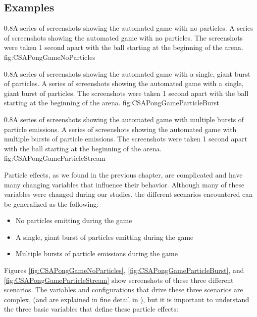 \subsection{Examples}\label{ssec:game_gameplay_examples}

{0.8}{A series of screenshots showing the automated game with no particles.}
{A series of screenshots showing the automated game with no particles. The screenshots were taken 1 second apart with the ball starting at the beginning of the arena.}
{fig:CSAPongGameNoParticles}

{0.8}{A series of screenshots showing the automated game with a single, giant burst of particles.}
{A series of screenshots showing the automated game with a single, giant burst of particles. The screenshots were taken 1 second apart with the ball starting at the beginning of the arena.}
{fig:CSAPongGameParticleBurst}

{0.8}{A series of screenshots showing the automated game with multiple bursts of particle emissions.}
{A series of screenshots showing the automated game with multiple bursts of particle emissions. The screenshots were taken 1 second apart with the ball starting at the beginning of the arena.}
{fig:CSAPongGameParticleStream}

Particle effects, as we found in the previous chapter, are complicated and have many changing variables that influence their behavior. Although many of these variables were changed during our studies, the different scenarios encountered can be generalized as the following:

\begin{itemize}[nolistsep,topsep=0pt]
	\item No particles emitting during the game
	\item A single, giant burst of particles emitting during the game
	\item Multiple bursts of particle emissions during the game
\end{itemize}
 
Figures \ref{fig:CSAPongGameNoParticles}, \ref{fig:CSAPongGameParticleBurst}, and \ref{fig:CSAPongGameParticleStream} show screenshots of these three different scenarios. The variables and configurations that drive these three scenarios are complex, (and are explained in fine detail in ), but it is important to understand the three basic variables that define these particle effects:

